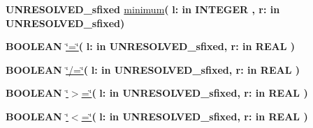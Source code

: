 \begin{DoxyCompactItemize}
\item 
{\bfseries {\bfseries \textcolor{vhdlchar}{U\+N\+R\+E\+S\+O\+L\+V\+E\+D\+\_\+sfixed}\textcolor{vhdlchar}{ }}} \hyperlink{class__fixed__pkg_ac6e7f426014fe929a97c17a175463b51}{minimum}{\bfseries  ( }{\bfseries \textcolor{vhdlchar}{l\+: }\textcolor{stringliteral}{in }{\bfseries \textcolor{comment}{I\+N\+T\+E\+G\+E\+R}\textcolor{vhdlchar}{ }}}{\bfseries  , \textcolor{vhdlchar}{r\+: }\textcolor{stringliteral}{in }\textcolor{vhdlchar}{U\+N\+R\+E\+S\+O\+L\+V\+E\+D\+\_\+sfixed}}{\bfseries  )} 
\item 
{\bfseries {\bfseries \textcolor{comment}{B\+O\+O\+L\+E\+A\+N}\textcolor{vhdlchar}{ }}} \hyperlink{class__fixed__pkg_a7949e9258ea0749e3b35961feea8db87}{\char`\"{}=\char`\"{}}{\bfseries  ( }{\bfseries \textcolor{vhdlchar}{l\+: }\textcolor{stringliteral}{in }\textcolor{vhdlchar}{U\+N\+R\+E\+S\+O\+L\+V\+E\+D\+\_\+sfixed}}{\bfseries  , \textcolor{vhdlchar}{r\+: }\textcolor{stringliteral}{in }{\bfseries \textcolor{comment}{R\+E\+A\+L}\textcolor{vhdlchar}{ }}}{\bfseries  )} 
\item 
{\bfseries {\bfseries \textcolor{comment}{B\+O\+O\+L\+E\+A\+N}\textcolor{vhdlchar}{ }}} \hyperlink{class__fixed__pkg_a00087aded97b434060226b9ba63a9077}{\char`\"{}/=\char`\"{}}{\bfseries  ( }{\bfseries \textcolor{vhdlchar}{l\+: }\textcolor{stringliteral}{in }\textcolor{vhdlchar}{U\+N\+R\+E\+S\+O\+L\+V\+E\+D\+\_\+sfixed}}{\bfseries  , \textcolor{vhdlchar}{r\+: }\textcolor{stringliteral}{in }{\bfseries \textcolor{comment}{R\+E\+A\+L}\textcolor{vhdlchar}{ }}}{\bfseries  )} 
\item 
{\bfseries {\bfseries \textcolor{comment}{B\+O\+O\+L\+E\+A\+N}\textcolor{vhdlchar}{ }}} \hyperlink{class__fixed__pkg_a4cd07e388cdbb3996dd11f56781d3758}{\char`\"{}$>$=\char`\"{}}{\bfseries  ( }{\bfseries \textcolor{vhdlchar}{l\+: }\textcolor{stringliteral}{in }\textcolor{vhdlchar}{U\+N\+R\+E\+S\+O\+L\+V\+E\+D\+\_\+sfixed}}{\bfseries  , \textcolor{vhdlchar}{r\+: }\textcolor{stringliteral}{in }{\bfseries \textcolor{comment}{R\+E\+A\+L}\textcolor{vhdlchar}{ }}}{\bfseries  )} 
\item 
{\bfseries {\bfseries \textcolor{comment}{B\+O\+O\+L\+E\+A\+N}\textcolor{vhdlchar}{ }}} \hyperlink{class__fixed__pkg_a65b73a94d4fe541a941f431175b342b7}{\char`\"{}$<$=\char`\"{}}{\bfseries  ( }{\bfseries \textcolor{vhdlchar}{l\+: }\textcolor{stringliteral}{in }\textcolor{vhdlchar}{U\+N\+R\+E\+S\+O\+L\+V\+E\+D\+\_\+sfixed}}{\bfseries  , \textcolor{vhdlchar}{r\+: }\textcolor{stringliteral}{in }{\bfseries \textcolor{comment}{R\+E\+A\+L}\textcolor{vhdlchar}{ }}}{\bfseries  )} 

\end{DoxyCompactItemize}
